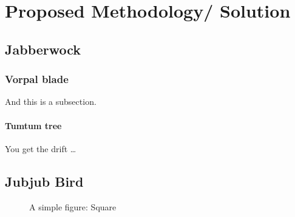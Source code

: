 %

\chapter{Proposed Methodology/ Solution}
\section{Jabberwock}
\subsection{Vorpal blade}
And this is a subsection.
	
\subsubsection{Tumtum tree}
You get the drift \ldots
		
\section{Jubjub Bird}

\begin{figure}[htbp]			%
\begin{center}
\caption{A simple figure: Square}	%
\label{circle}
\end{center}
\end{figure}

